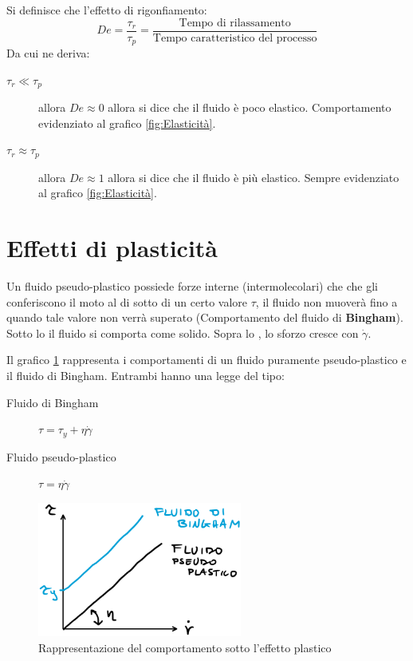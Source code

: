 Si definisce che l'effetto di rigonfiamento:
\begin{equation}
De = \frac{\tau_r}{\tau_p} = \frac{\text{Tempo di rilassamento}}{\text{Tempo caratteristico del processo}}
\end{equation}
Da cui ne deriva:
\begin{description}
\item[$\tau_r \ll \tau_p$] allora $De \approx 0$ allora si dice che il fluido è poco elastico. Comportamento evidenziato al grafico \ref{fig:Elasticità}.
\item[$\tau_r \approx \tau_p$] allora $De \approx 1$ allora si dice che il fluido è più elastico. Sempre evidenziato al grafico \ref{fig:Elasticità}.
\end{description}

\section{Effetti di plasticità}
Un fluido pseudo-plastico possiede forze interne (intermolecolari) che che gli conferiscono il moto al di sotto di un certo valore $\tau$, il fluido non muoverà fino a quando tale valore non verrà superato (Comportamento del fluido di \textbf{Bingham}). 
Sotto lo  il fluido si comporta come solido.
Sopra lo , lo sforzo cresce con $\dot{\gamma}$.

Il grafico \ref{fig:EffettoPlastico} rappresenta i comportamenti di un fluido puramente pseudo-plastico e il fluido di Bingham.
Entrambi hanno una legge del tipo:
\begin{description}
\item[Fluido di Bingham] $\tau = \tau_y + \eta \dot{\gamma}$
\item[Fluido pseudo-plastico] $\tau = \eta \dot{\gamma}$
\end{description}

\begin{figure}
\centering
\includegraphics[width = 0.6\textwidth]{gfx/EffettoPlastico}
\caption{Rappresentazione del comportamento sotto l'effetto plastico}
\label{fig:EffettoPlastico}
\end{figure}